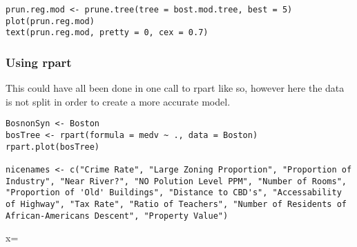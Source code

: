 \documentclass[
]{article}
\begin{document}
\begin{lstlisting}
prun.reg.mod <- prune.tree(tree = bost.mod.tree, best = 5)
plot(prun.reg.mod)
text(prun.reg.mod, pretty = 0, cex = 0.7)
\end{lstlisting}

\hypertarget{using-rpart}{%
\subsubsection{Using rpart}\label{using-rpart}}

This could have all been done in one call to rpart like so, however here
the data is not split in order to create a more accurate model.

\begin{lstlisting}
BosnonSyn <- Boston
bosTree <- rpart(formula = medv ~ ., data = Boston)
rpart.plot(bosTree)

nicenames <- c("Crime Rate", "Large Zoning Proportion", "Proportion of Industry", "Near River?", "NO Polution Level PPM", "Number of Rooms", "Proportion of 'Old' Buildings", "Distance to CBD's", "Accessability of Highway", "Tax Rate", "Ratio of Teachers", "Number of Residents of African-Americans Descent", "Property Value")
\end{lstlisting}


x= 
\end{document}
